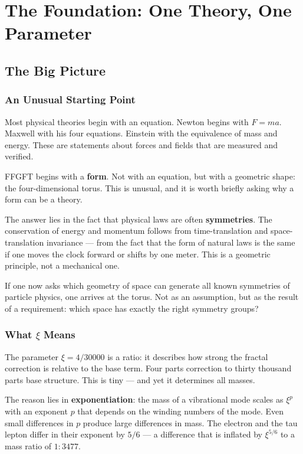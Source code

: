 \documentclass[12pt,oneside]{book}
\begin{document}
\mainmatter

\part{The Foundation: One Theory, One Parameter}

\chapter{The Big Picture}

\section{An Unusual Starting Point}

Most physical theories begin with an equation. Newton begins with $F = ma$. Maxwell with his four equations. Einstein with the equivalence of mass and energy. These are statements about forces and fields that are measured and verified.

FFGFT begins with a \textbf{form}. Not with an equation, but with a geometric shape: the four-dimen\-sional torus. This is unusual, and it is worth briefly asking why a form can be a theory.

The answer lies in the fact that physical laws are often \textbf{symmetries}. The conservation of energy and momentum follows from time-translation and space-translation invariance --- from the fact that the form of natural laws is the same if one moves the clock forward or shifts by one meter. This is a geometric principle, not a mechanical one.

If one now asks which geometry of space can generate all known symmetries of particle physics, one arrives at the torus. Not as an assumption, but as the result of a requirement: which space has exactly the right symmetry groups?

\section{What $\xi$ Means}

The parameter $\xi = 4/30000$ is a ratio: it describes how strong the fractal cor\-rection is relative to the base term. Four parts correction to thirty thousand parts base structure. This is tiny --- and yet it determines all masses.

The reason lies in \textbf{exponentiation}: the mass of a vibrational mode scales as $\xi^p$ with an exponent $p$ that depends on the winding numbers of the mode. Even small differences in $p$ produce large differences in mass. The electron and the tau lepton differ in their exponent by $5/6$ --- a difference that is inflated by $\xi^{5/6}$ to a mass ratio of $1 : 3477$.
\end{document}
